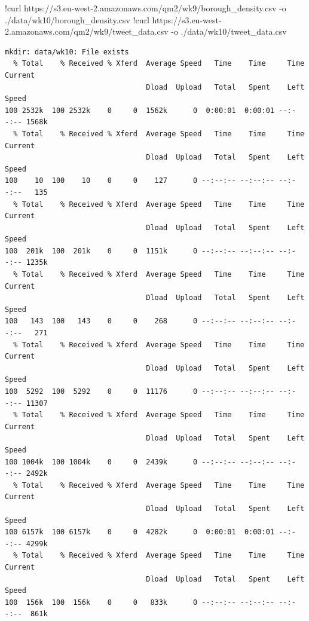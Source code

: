 \documentclass[
  letterpaper,
  DIV=11,
  numbers=noendperiod]{scrreprt}
\newenvironment{Shaded}{\begin{snugshade}}{\end{snugshade}}
\newcommand{\ErrorTok}[1]{\textcolor[rgb]{0.68,0.00,0.00}{#1}}
\newcommand{\FloatTok}[1]{\textcolor[rgb]{0.68,0.00,0.00}{#1}}
\newcommand{\NormalTok}[1]{\textcolor[rgb]{0.00,0.23,0.31}{#1}}
\newcommand{\OperatorTok}[1]{\textcolor[rgb]{0.37,0.37,0.37}{#1}}
\begin{document}
\begin{Shaded}
\begin{Highlighting}[]
\OperatorTok{!}\NormalTok{curl https:}\OperatorTok{//}\NormalTok{s3.eu}\OperatorTok{{-}}\NormalTok{west}\OperatorTok{{-}}\FloatTok{2.}\ErrorTok{amazonaws}\NormalTok{.com}\OperatorTok{/}\NormalTok{qm2}\OperatorTok{/}\NormalTok{wk9}\OperatorTok{/}\NormalTok{borough\_density.csv }\OperatorTok{{-}}\NormalTok{o .}\OperatorTok{/}\NormalTok{data}\OperatorTok{/}\NormalTok{wk10}\OperatorTok{/}\NormalTok{borough\_density.csv}
\OperatorTok{!}\NormalTok{curl https:}\OperatorTok{//}\NormalTok{s3.eu}\OperatorTok{{-}}\NormalTok{west}\OperatorTok{{-}}\FloatTok{2.}\ErrorTok{amazonaws}\NormalTok{.com}\OperatorTok{/}\NormalTok{qm2}\OperatorTok{/}\NormalTok{wk9}\OperatorTok{/}\NormalTok{tweet\_data.csv }\OperatorTok{{-}}\NormalTok{o .}\OperatorTok{/}\NormalTok{data}\OperatorTok{/}\NormalTok{wk10}\OperatorTok{/}\NormalTok{tweet\_data.csv}
\end{Highlighting}
\end{Shaded}

\begin{verbatim}
mkdir: data/wk10: File exists
  % Total    % Received % Xferd  Average Speed   Time    Time     Time  Current
                                 Dload  Upload   Total   Spent    Left  Speed
100 2532k  100 2532k    0     0  1562k      0  0:00:01  0:00:01 --:--:-- 1568k
  % Total    % Received % Xferd  Average Speed   Time    Time     Time  Current
                                 Dload  Upload   Total   Spent    Left  Speed
100    10  100    10    0     0    127      0 --:--:-- --:--:-- --:--:--   135
  % Total    % Received % Xferd  Average Speed   Time    Time     Time  Current
                                 Dload  Upload   Total   Spent    Left  Speed
100  201k  100  201k    0     0  1151k      0 --:--:-- --:--:-- --:--:-- 1235k
  % Total    % Received % Xferd  Average Speed   Time    Time     Time  Current
                                 Dload  Upload   Total   Spent    Left  Speed
100   143  100   143    0     0    268      0 --:--:-- --:--:-- --:--:--   271
  % Total    % Received % Xferd  Average Speed   Time    Time     Time  Current
                                 Dload  Upload   Total   Spent    Left  Speed
100  5292  100  5292    0     0  11176      0 --:--:-- --:--:-- --:--:-- 11307
  % Total    % Received % Xferd  Average Speed   Time    Time     Time  Current
                                 Dload  Upload   Total   Spent    Left  Speed
100 1004k  100 1004k    0     0  2439k      0 --:--:-- --:--:-- --:--:-- 2492k
  % Total    % Received % Xferd  Average Speed   Time    Time     Time  Current
                                 Dload  Upload   Total   Spent    Left  Speed
100 6157k  100 6157k    0     0  4282k      0  0:00:01  0:00:01 --:--:-- 4299k
  % Total    % Received % Xferd  Average Speed   Time    Time     Time  Current
                                 Dload  Upload   Total   Spent    Left  Speed
100  156k  100  156k    0     0   833k      0 --:--:-- --:--:-- --:--:--  861k
\end{verbatim}
\end{document}
